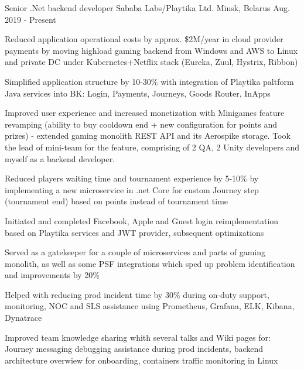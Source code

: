 

\begin{cventries}

  \cventry
    {Senior .Net backend developer} %
    {Sababa Labs/Playtika Ltd.} %
    {Minsk, Belarus} %
    {Aug. 2019 - Present} %
    {
      \begin{cvitems} %
        \item {Reduced application operational costs by approx. \$2M/year in cloud provider payments by moving highload gaming backend from Windows and AWS to Linux and private DC under Kubernetes+Netflix stack (Eureka, Zuul, Hystrix, Ribbon)}
        \item {Simplified application structure by 10-30\% with integration of Playtika paltform Java services into BK: Login, Payments, Journeys, Goods Router, InApps}
        \item {Improved user experience and increased monetization with Minigames feature revamping (ability to buy cooldown end + new configuration for points and prizes) - extended gaming monolith REST API and its Aerospike storage. Took the lead of mini-team for the feature, comprising of 2 QA, 2 Unity developers and myself as a backend developer.}
        \item {Reduced players waiting time and tournament experience by 5-10\% by implementing a new microservice in .net Core for custom Journey step (tournament end) based on points instead of tournament time}
        \item {Initiated and completed Facebook, Apple and Guest login reimplementation based on Playtika services and JWT provider, subsequent optimizations}
        \item {Served as a gatekeeper for a couple of microservices and parts of gaming monolith, as well as some PSF integrations which sped up problem identification and improvements by 20\%}
        \item {Helped with reducing prod incident time by 30\% during on-duty support, monitoring, NOC and SLS assistance using Prometheus, Grafana, ELK, Kibana, Dynatrace}
        \item {Improved team knowledge sharing whith several talks and Wiki pages for: Journey messaging debugging assistance during prod incidents, backend architecture overwiew for onboarding, containers traffic monitoring in Linux}
      \end{cvitems}
    }


\end{cventries}
